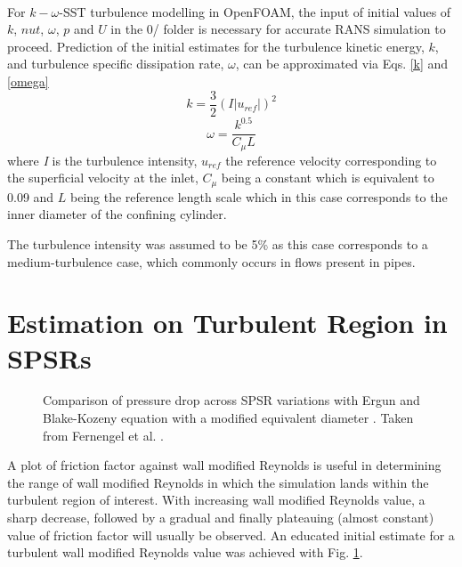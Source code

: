 For $k-\omega$-SST turbulence modelling in OpenFOAM\textsuperscript{\textregistered}, the input of initial values of $k$, $nut$, $\omega$, $p$ and $U$ in the 0/ folder is necessary for accurate RANS simulation to proceed. Prediction of the initial estimates for the turbulence kinetic energy, $k$, and turbulence specific dissipation rate, $\omega$, can be approximated via Eqs. \ref{k} and \ref{omega} \cite{OpenFOAMUserGuideKOmegaSST}
\begin{equation}\label{k}
k = \frac{3}{2}(\textit{I}\lvert u_{ref} \rvert)^2
\end{equation}
\begin{equation}\label{omega}
\omega = \frac{k^{0.5}}{C_\textit{$\mu$} L}
\end{equation}
where \textit{I} is the turbulence intensity, $u_{ref}$ the reference velocity corresponding to the superficial velocity at the inlet, $C_\textit{$\mu$}$ being a constant which is equivalent to 0.09 and $L$ being the reference length scale which in this case corresponds to the inner diameter of the confining cylinder.

The turbulence intensity was assumed to be 5\% as this case corresponds to a medium-turbulence case, which commonly occurs in flows present in pipes.
\section{Estimation on Turbulent Region in SPSRs}
\begin{figure} [h]%
	\centering
	\caption[Comparison of pressure drop across SPSR variations with Ergun and Blake-Kozeny using modified equivalent diameter.]{Comparison of pressure drop across SPSR variations with Ergun \cite{Ergun1952} and Blake-Kozeny \cite{Blake1922,Kozeny1927} equation with a modified equivalent diameter \cite{Scott1974}. Taken from Fernengel et al. \cite{Fernengel2020}.}%
	\label{fig:ComparisonAcrossSPSRVariations}%
\end{figure}
\newpage
A plot of friction factor against wall modified Reynolds is useful in determining the range of wall modified Reynolds in which the simulation lands within the turbulent region of interest. With increasing wall modified Reynolds value, a sharp decrease, followed by a gradual and finally plateauing (almost constant) value of friction factor will usually be observed. An educated initial estimate for a turbulent wall modified Reynolds value was achieved with Fig. \ref{fig:ComparisonAcrossSPSRVariations}.

